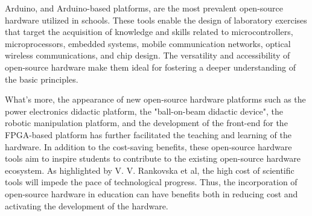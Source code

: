 \documentclass[final-report.tex]{subfiles}
\begin{document}
Arduino, and Arduino-based platforms, are the most prevalent open-source hardware utilized in schools. 
These tools enable the design of laboratory exercises that target the acquisition of knowledge and skills related to microcontrollers\cite{rankovska2022applying}, microprocessors\cite{papazoglou2017openhardsim}, embedded systems\cite{beneder2017development}, mobile communication networks\cite{lin2017teaching}, optical wireless communications\cite{ahmed2021gr}, and chip design\cite{alam2022open}. 
The versatility and accessibility of open-source hardware make them ideal for fostering a deeper understanding of the basic principles.

What's more, the appearance of new open-source hardware platforms such as the power electronics didactic platform\cite{koleff2019development}, the "ball-on-beam didactic device"\cite{takacs2021bobshield}, the robotic manipulation platform\cite{vcehovin2023low}, and the development of the front-end for the FPGA-based platform\cite{beneder2017development} has further facilitated the teaching and learning of the hardware. 
In addition to the cost-saving benefits, these open-source hardware tools aim to inspire students to contribute to the existing open-source hardware ecosystem. 
As highlighted by V. V. Rankovska et al, the high cost of scientific tools will impede the pace of technological progress. \cite{rankovska2022applying}
Thus, the incorporation of open-source hardware in education can have benefits both in reducing cost and activating the development of the hardware.
\end{document}
